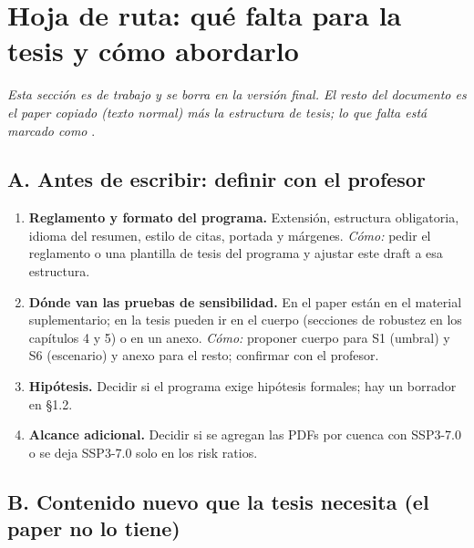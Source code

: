 \chapter*{Hoja de ruta: qué falta para la tesis y cómo abordarlo}
\emph{Esta sección es de trabajo y se borra en la versión final. El resto del documento es el paper copiado (texto normal) más la estructura de tesis; lo que falta está marcado como} \textbf{\pendiente{\ldots{}}}.

\section*{A. Antes de escribir: definir con el profesor}\label{a.-antes-de-escribir-definir-con-el-profesor}

\begin{enumerate}
\def\labelenumi{\arabic{enumi}.}
\tightlist
\item
  \textbf{Reglamento y formato del programa.} Extensión, estructura obligatoria, idioma del resumen, estilo de citas, portada y márgenes. \emph{Cómo:} pedir el reglamento o una plantilla de tesis del programa y ajustar este draft a esa estructura.
\item
  \textbf{Dónde van las pruebas de sensibilidad.} En el paper están en el material suplementario; en la tesis pueden ir en el cuerpo (secciones de robustez en los capítulos 4 y 5) o en un anexo. \emph{Cómo:} proponer cuerpo para S1 (umbral) y S6 (escenario) y anexo para el resto; confirmar con el profesor.
\item
  \textbf{Hipótesis.} Decidir si el programa exige hipótesis formales; hay un borrador en §1.2.
\item
  \textbf{Alcance adicional.} Decidir si se agregan las PDFs por cuenca con SSP3-7.0 o se deja SSP3-7.0 solo en los risk ratios.
\end{enumerate}

\section*{B. Contenido nuevo que la tesis necesita (el paper no lo tiene)}\label{b.-contenido-nuevo-que-la-tesis-necesita-el-paper-no-lo-tiene}

